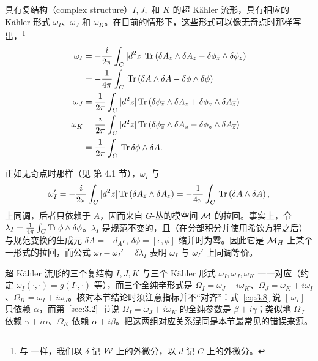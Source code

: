 具有复结构（complex structure）$I,J,$ 和 $K$ 的超 Kähler 流形，具有相应的 Kähler 形式 $\omega_I$、$\omega_J$ 和
$\omega_K$。在目前的情形下，这些形式可以像无奇点时那样写出，\footnote{与 \cite{ref8} 一样，我们以 $\delta$ 记 $\mathcal{W}$ 上的外微分，以 $d$ 记 $C$ 上的外微分。}
\setcounter{equation}{2}
\begin{equation}\label{eq:3.3}
  \begin{aligned}\omega_I & =
-{i\over 2\pi}\int_C|d^2z|\,{\rm Tr}\left(\delta A_{\overline z}\wedge
\delta A_z-\delta \phi_{\overline z}\wedge \delta\phi_z\right)\\
&=-{1\over 4\pi}\int_C\,{\rm Tr}\left(\delta A\wedge \delta A
-\delta\phi\wedge\delta \phi\right) \\
                      \omega_J & ={1\over 2\pi}\int_C |d^2z|\,{\rm Tr}\left(
                      \delta\phi_{\overline z}\wedge \delta A_z+\delta\phi_z\wedge
                      \delta A_{\overline z} \right)\\
                      \omega_K & =
                      {i\over 2\pi}\int_C|d^2z|\,{\rm Tr}\left(\delta\phi_{\overline z}
                      \wedge\delta A_z-\delta\phi_z\wedge\delta A_{\overline z}\right)\\
                      & = {1\over 2\pi}\int_C \,{\rm Tr}\,\delta\phi
                      \wedge\delta A.\end{aligned}
\end{equation}


正如无奇点时那样（见 \cite{ref8} 第 4.1 节），$\omega_I$ 与
\setcounter{equation}{3}
\begin{equation}\label{eq:3.4}
  \omega_I'  =
-{i\over 2\pi}\int_C|d^2z|\,{\rm Tr}\left(\delta A_{\overline z}\wedge
\delta A_z\right)=-{1\over 4\pi}\int_C\,{\rm Tr}\left(\delta A\wedge
\delta A \right),
\end{equation}
上同调，后者只依赖于 $A$，因而来自 $G$-丛的模空间 ${\mathcal{M}}$ 的拉回。事实上，令 $\lambda_I={1\over 4\pi}\int_C{\rm Tr}
\,\phi\wedge\delta \phi$。$\lambda_I$ 是规范不变的，且（在分部积分并使用希钦方程之后）与规范变换的生成元 $\delta A=-d_A\epsilon,
\,\delta\phi=[\epsilon,\phi]$ 缩并时为零。因此它是 ${{\mathcal{M}}_H}$ 上某个一形式的拉回，而公式
$\omega_I-\omega_I'=\delta\lambda_I$ 表明 $\omega_I$ 与 $\omega_I'$ 上同调等价。

\begin{yizhu}[易错点]
超 Kähler 流形的三个复结构 $I,J,K$ 与三个 Kähler 形式 $\omega_I,\omega_J,\omega_K$ 一一对应（约定 $\omega_I(\cdot,\cdot)=g(I\cdot,\cdot)$ 等），而三个全纯辛形式是 $\Omega_I=\omega_J+i\omega_K$、$\Omega_J=\omega_K+i\omega_I$、$\Omega_K=\omega_I+i\omega_J$。核对本节结论时须注意指标并不“对齐”：式~\eqref{eq:3.8} 说 $[\,\omega_I]$ 只依赖 $\alpha$，而第~\ref{sec:3.2}~节说 $\Omega_I=\omega_J+i\omega_K$ 的全纯参数是 $\beta+i\gamma$；类似地 $\Omega_J$ 依赖 $\gamma+i\alpha$、$\Omega_K$ 依赖 $\alpha+i\beta$。把这两组对应关系混同是本节最常见的错误来源。
\end{yizhu}

